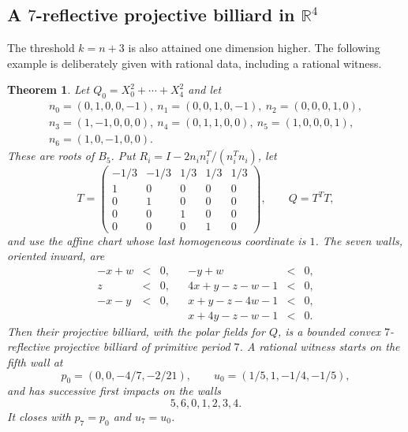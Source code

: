 \documentclass[11pt,a4paper]{article}
\theoremstyle{plain}
\newtheorem{theorem}{Theorem}[section]
\theoremstyle{definition}
\theoremstyle{remark}
\begin{document}
\subsection{A $7$-reflective projective billiard in $\mathbb{R}^4$}

The threshold $k=n+3$ is also attained one dimension higher.  The following
example is deliberately given with rational data, including a rational witness.

\begin{theorem}\label{thm:rp4b5}
Let $Q_0=X_0^2+\cdots+X_4^2$ and let
\[
\begin{gathered}
 n_0=(0,1,0,0,-1),\ n_1=(0,0,1,0,-1),\ n_2=(0,0,0,1,0),\\
 n_3=(1,-1,0,0,0),\ n_4=(0,1,1,0,0),\ n_5=(1,0,0,0,1),\\
 n_6=(1,0,-1,0,0).
\end{gathered}
\]
These are roots of $B_5$.  Put $R_i=I-2n_i n_i^T/(n_i^Tn_i)$, let
\[
 T=\begin{pmatrix}
 -1/3&-1/3&1/3&1/3&1/3\\
 1&0&0&0&0\\0&1&0&0&0\\0&0&1&0&0\\0&0&0&1&0
 \end{pmatrix},\qquad Q=T^T T,
\]
and use the affine chart whose last homogeneous coordinate is $1$.  The seven
walls, oriented inward, are
\[
\begin{array}{rclcrcl}
 -x+w&<&0,&&-y+w&<&0,\\
 z&<&0,&&4x+y-z-w-1&<&0,\\
 -x-y&<&0,&&x+y-z-4w-1&<&0,\\
 &&& &x+4y-z-w-1&<&0.
\end{array}
\]
Then their projective billiard, with the polar fields for $Q$, is a bounded
convex $7$-reflective projective billiard of primitive period $7$.  A rational
witness starts on the fifth wall at
\[
 p_0=(0,0,-4/7,-2/21),\qquad
 u_0=(1/5,1,-1/4,-1/5),
\]
and has successive first impacts on the walls
\[
 5,6,0,1,2,3,4.
\]
It closes with $p_7=p_0$ and $u_7=u_0$.
\end{theorem}
\end{document}
